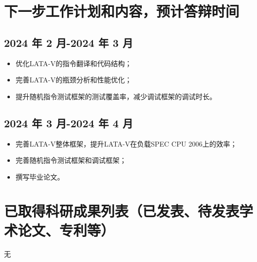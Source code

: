 \section{下一步工作计划和内容，预计答辩时间}
\subsection*{2024 年 2 月-2024 年 3 月}
\begin{itemize}[left=0pt]
    \item 优化LATA-V的指令翻译和代码结构；
    \item 完善LATA-V的瓶颈分析和性能优化；
    \item 提升随机指令测试框架的测试覆盖率，减少调试框架的调试时长。
\end{itemize}

\subsection*{2024 年 3 月-2024 年 4 月}
\begin{itemize}[left=0pt]
    \item 完善LATA-V整体框架，提升LATA-V在负载SPEC CPU 2006上的效率；
    \item 完善随机指令测试框架和调试框架；
    \item 撰写毕业论文。
\end{itemize}

\section{已取得科研成果列表（已发表、待发表学术论文、专利等）}
无
\nocite{*}%
